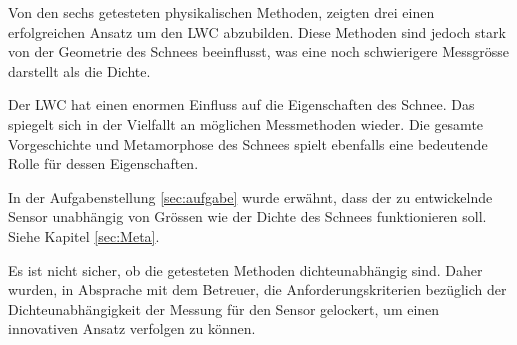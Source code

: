
Von den sechs getesteten physikalischen Methoden, zeigten drei einen erfolgreichen Ansatz um den LWC abzubilden. Diese Methoden sind jedoch stark von der Geometrie des Schnees beeinflusst, was eine noch schwierigere Messgrösse darstellt als die Dichte.

Der LWC hat einen enormen Einfluss auf die Eigenschaften des Schnee. Das spiegelt sich in der Vielfallt an möglichen Messmethoden wieder. Die gesamte Vorgeschichte und Metamorphose des Schnees spielt ebenfalls eine bedeutende Rolle für dessen Eigenschaften.

In der Aufgabenstellung \ref{sec:aufgabe} wurde erwähnt, dass der zu entwickelnde Sensor unabhängig von Grössen wie der Dichte des Schnees funktionieren soll. Siehe Kapitel \ref{sec:Meta}.


Es ist nicht sicher, ob die getesteten Methoden dichteunabhängig sind. Daher wurden, in Absprache mit dem Betreuer, die Anforderungskriterien bezüglich der Dichteunabhängigkeit der Messung für den Sensor gelockert, um einen innovativen Ansatz verfolgen zu können.
